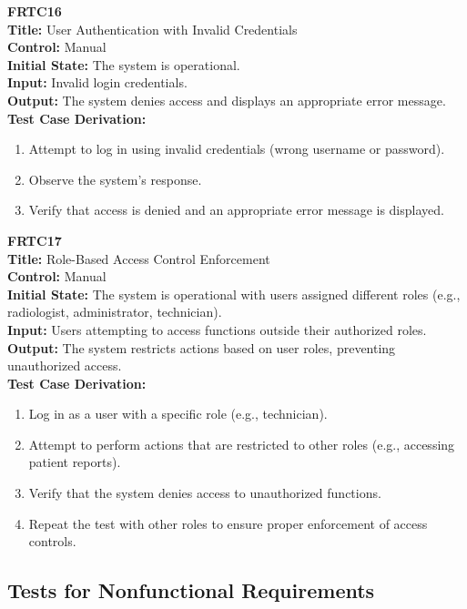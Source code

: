 \documentclass[12pt, titlepage]{article}
\begin{document}
\textbf{FRTC16}\\
\textbf{Title:} User Authentication with Invalid Credentials\\
\textbf{Control:} Manual\\
\textbf{Initial State:} The system is operational.\\
\textbf{Input:} Invalid login credentials.\\
\textbf{Output:} The system denies access and displays an appropriate error message.\\
\textbf{Test Case Derivation:}
\begin{enumerate}
  \item Attempt to log in using invalid credentials (wrong username or password).
  \item Observe the system's response.
  \item Verify that access is denied and an appropriate error message is displayed.
\end{enumerate}
\vspace{1em}

\textbf{FRTC17}\\
\textbf{Title:} Role-Based Access Control Enforcement\\
\textbf{Control:} Manual\\
\textbf{Initial State:} The system is operational with users assigned different roles (e.g., radiologist, administrator, technician).\\
\textbf{Input:} Users attempting to access functions outside their authorized roles.\\
\textbf{Output:} The system restricts actions based on user roles, preventing unauthorized access.\\
\textbf{Test Case Derivation:}
\begin{enumerate}
  \item Log in as a user with a specific role (e.g., technician).
  \item Attempt to perform actions that are restricted to other roles (e.g., accessing patient reports).
  \item Verify that the system denies access to unauthorized functions.
  \item Repeat the test with other roles to ensure proper enforcement of access controls.
\end{enumerate}
\vspace{1em}

\subsection{Tests for Nonfunctional Requirements}
\end{document}
